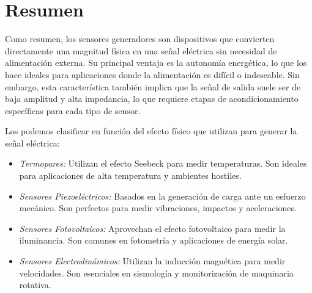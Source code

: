 \begin{marginfigure}
    \caption[Sensores electrodinámicos.]{Sensores electrodinámicos: (a) Principio de funcionamiento de un transductor de velocidad lineal. (b) Estructura interna de un geófono, donde la inercia de la masa suspendida permite medir vibraciones terrestres.}\label{fig:sensores_electrodinamicos}
\end{marginfigure}


\section{Resumen}\label{sec:resumen_generadores}

Como resumen, los sensores generadores son dispositivos que convierten directamente una magnitud física en una señal eléctrica sin necesidad de alimentación externa. Su principal ventaja es la autonomía energética, lo que los hace ideales para aplicaciones donde la alimentación es difícil o indeseable. Sin embargo, esta característica también implica que la señal de salida suele ser de baja amplitud y alta impedancia, lo que requiere etapas de acondicionamiento específicas para cada tipo de sensor.

Los podemos clasificar en función del efecto físico que utilizan para generar la señal eléctrica:
\begin{itemize}
    \item \emph{Termopares:} Utilizan el efecto Seebeck para medir temperaturas. Son ideales para aplicaciones de alta temperatura y ambientes hostiles.
    \item \emph{Sensores Piezoeléctricos:} Basados en la generación de carga ante un esfuerzo mecánico. Son perfectos para medir vibraciones, impactos y aceleraciones.
    \item \emph{Sensores Fotovoltaicos:} Aprovechan el efecto fotovoltaico para medir la iluminancia. Son comunes en fotometría y aplicaciones de energía solar.
    \item \emph{Sensores Electrodinámicos:} Utilizan la inducción magnética para medir velocidades. Son esenciales en sismología y monitorización de maquinaria rotativa.
\end{itemize}

